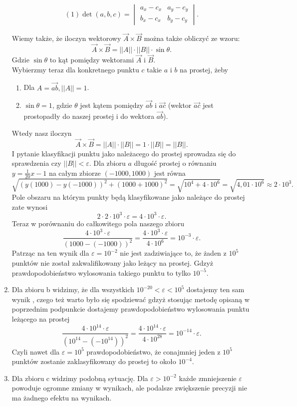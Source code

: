 \begin{enumerate}
$$
(1)\det(a, b, c)= \begin{vmatrix}
       a_{x} - c_{x} & a_{y} - c_{y} \\
       b_{x} - c_{x} & b_{y} - c_{y} 
              \end{vmatrix}.
$$\par
Wiemy także, że iloczyn wektorowy $\overrightarrow{A} \times \overrightarrow{B}$ można także obliczyć ze wzoru: 
$$
\overrightarrow{A} \times \overrightarrow{B} = ||A|| \cdot ||B|| \cdot \sin{\theta}.
$$
\quad Gdzie $\sin{\theta}$ to kąt pomiędzy wektorami $\overrightarrow{A}$ i $\overrightarrow{B}$.\\
Wybierzmy teraz dla konkretnego punktu $c$ takie $a$ i $b$ na prostej, żeby 
\begin{enumerate}
    \item Dla $A = \overrightarrow{ab}, ||{A}|| = 1$.
    \item $\sin{\theta} = 1$, gdzie $\theta$ jest kątem pomiędzy $\overrightarrow{ab}$ i $\overrightarrow{ac}$ (wektor $\overrightarrow{ac}$ jest prostopadły do naszej prostej i do wektora $\overrightarrow{ab}$).
\end{enumerate}
Wtedy nasz iloczyn $$\overrightarrow{A} \times \overrightarrow{B} = ||A|| \cdot ||B|| = 1 \cdot ||B|| = ||B||.$$
\quad I pytanie klasyfikacji punktu jako należacego do prostej sprowadza się do sprawdzenia czy $||B|| < \varepsilon$.
Dla zbioru $a$ długość prostej o równaniu $y = \frac{1}{20}x - 1$ na całym zbiorze $(-1000, 1000)$ jest równa 
$$
    \sqrt{(y(1000) - y(-1000))^2 + (1000 + 1000)^2} = \sqrt{10 ^ 4 + 4 \cdot 10^6} = \sqrt{4,01 \cdot 10^6} \approx 2 \cdot 10^3.
$$
Pole obszaru na którym punkty będą klasyfikowane jako należące do prostej zate wynosi
$$
    2 \cdot 2 \cdot 10^3 \cdot \varepsilon = 4 \cdot 10^3 \cdot \varepsilon.
$$
Teraz w porównaniu do całkowitego pola naszego zbioru
$$
    \frac{4 \cdot 10^3 \cdot \varepsilon}{(1000 - (-1000))^2}=
    \frac{4 \cdot 10^3 \cdot \varepsilon}{4 \cdot 10^6} =  10^{-3} \cdot \varepsilon.
$$
\quad Patrząc na ten wynik dla $\varepsilon = 10^{-2}$ nie jest zadziwiające to, że 
żaden z $10^5$ punktów nie został zakwalifikowany jako leżący na prostej. Gdzyż prawdopodobieństwo 
wylosowania takiego punktu to tylko $10^{-5}$.
\item \quad Dla zbioru b widzimy, że dla wszystkich $10^{-20} < \varepsilon < 10^5$ dostajemy ten sam wynik 
, czego też warto było się spodziewać gdzyż stosując metodę opisaną w poprzednim podpunkcie dostajemy 
prawdopodobieństwo wylosowania punktu leżącego na prostej 
$$
    \frac{4 \cdot 10^{14} \cdot \varepsilon}{(10^{14} - (-10^{14}))^2}=
    \frac{4 \cdot 10^{14} \cdot \varepsilon}{4 \cdot 10^{28}} =  10^{-14} \cdot \varepsilon.
$$
\quad Czyli nawet dla $\varepsilon = 10^5$ prawdopodobieństwo, że conajmniej jeden z $10^5$ punktów zostanie zaklasyfikowany 
do prostej to około $10^{-4}$.
\item \quad Dla zbioru c widzimy podobną sytuację. Dla $\varepsilon > 10^{-2}$ 
każde zmniejszenie $\varepsilon$ powoduje ogromne zmiany w wynikach, ale podalsze zwiększenie precyzji 
nie ma żadnego efektu na wynikach.


\end{enumerate}
